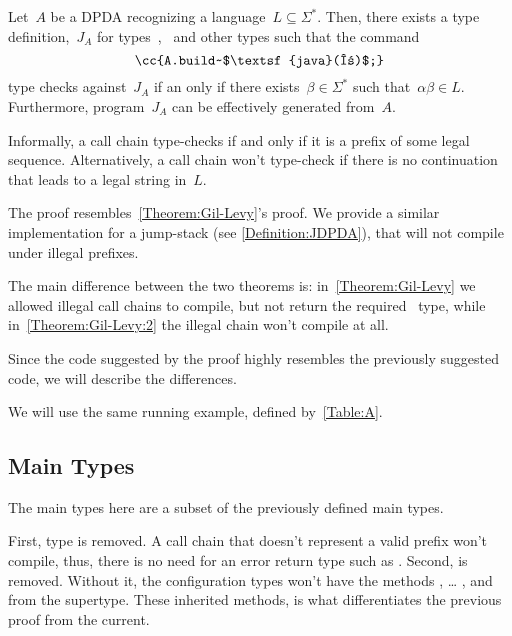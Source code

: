\begin{theorem}\label{Theorem:Gil-Levy:2}
  Let~$A$ be a DPDA recognizing a language~$L⊆Σ^*$.
  Then, there exists a \Java type definition,~$J_A$ for types~,~ and
    other types such that the \Java command
  \begin{equation}
    \label{Equation:result}
    \cc{A.build~$\textsf{java}(α)$;}
  \end{equation}
  type checks against~$J_A$ if an only if there exists~$β∈Σ^*$ such
  that~$αβ∈L$.
  Furthermore, program~$J_A$ can be effectively generated from~$A$.
\end{theorem}

Informally, a call chain type-checks if and only if it is a prefix
  of some legal sequence.
Alternatively, a call chain won't type-check if there is no
  continuation that leads to a legal string in~$L$.

The proof resembles~\cref{Theorem:Gil-Levy}'s proof.
We provide a similar implementation for a jump-stack (see \cref{Definition:JDPDA}),
  that will not compile under illegal prefixes.

The main difference between the two theorems is:
  in~\cref{Theorem:Gil-Levy} we allowed illegal call chains to compile,
  but not return the required~ type, while in~\cref{Theorem:Gil-Levy:2}
  the illegal chain won't compile at all.
  
Since the code suggested by the proof highly resembles the previously
  suggested code, we will describe the differences.
  
We will use the same running example, defined by~\cref{Table:A}.

\subsection{Main Types}
The main types here are a subset of the previously defined main types.

\begin{quote}
\end{quote}

First, type \cc{$\Sigma\Sigma$} is removed. 
A call chain that doesn't represent a valid prefix won't compile, 
  thus, there is no need for an error return type such as \cc{$\Sigma\Sigma$}.
Second,   is removed. 
Without it, the configuration types won't have the 
  methods , … , and \cc{\$()} from the supertype.
These inherited methods, is what differentiates the previous proof from the current.

